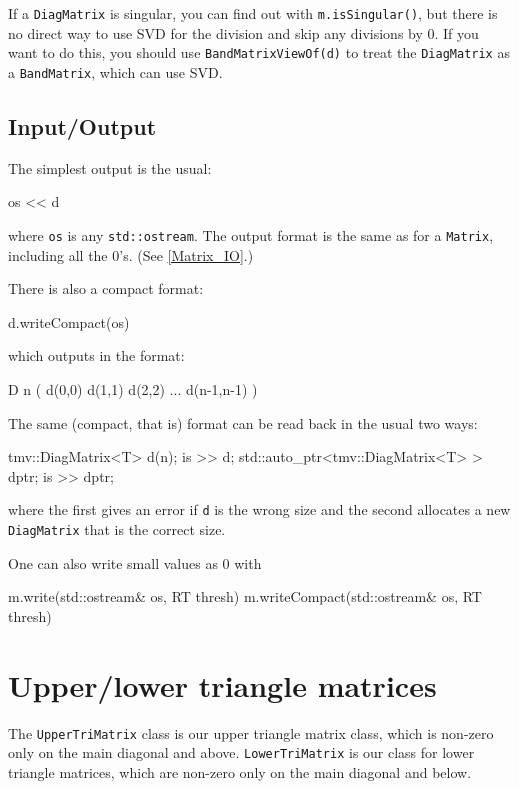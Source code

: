 \documentclass[twoside,letterpaper,11pt]{article}
\renewcommand{\tt}[1]{{\lstinline {#1}}}
\begin{document}
If a \tt{DiagMatrix} is singular, you can find out with \tt{m.isSingular()},
but there is no direct way to use SVD for the division and skip any
divisions by 0.  If you want to do this, you should use \tt{BandMatrixViewOf(d)} to 
treat the \tt{DiagMatrix} as a \tt{BandMatrix}, which can use SVD.

\subsection{Input/Output}
\label{DiagMatrix_IO}

The simplest output is the usual:
\begin{tmvcode}
os << d
\end{tmvcode}
where \tt{os} is any \tt{std::ostream}.
The output format is the same as for a \tt{Matrix}, including all the 0's.
(See \ref{Matrix_IO}.)


There is also a compact format:
\begin{tmvcode}
d.writeCompact(os)
\end{tmvcode}
which outputs in the format:
\begin{tmvcode}
D n ( d(0,0)  d(1,1)  d(2,2)  ...  d(n-1,n-1) )
\end{tmvcode}

The same (compact, that is) format can be read back in the usual two ways:
\begin{tmvcode}
tmv::DiagMatrix<T> d(n);
is >> d;
std::auto_ptr<tmv::DiagMatrix<T> > dptr;
is >> dptr;
\end{tmvcode}
where the first gives an error if \tt{d} is the wrong size and the second allocates
a new \tt{DiagMatrix} that is the correct size.

One can also write small values as 0 with
\begin{tmvcode}
m.write(std::ostream& os, RT thresh)
m.writeCompact(std::ostream& os, RT thresh)
\end{tmvcode}

\newpage
\section{Upper/lower triangle matrices}
\label{TriMatrix}

The \tt{UpperTriMatrix} class is our upper triangle matrix class, which is non-zero
only on the main diagonal and above.  \tt{LowerTriMatrix} is our class for lower
triangle matrices, which are non-zero only on the main diagonal and below.
\end{document}
